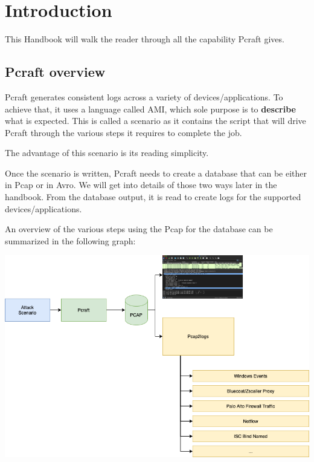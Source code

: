 \documentclass[10pt]{article}
\begin{document}
\newpage

\tableofcontents

\newpage

\section{Introduction}

This Handbook will walk the reader through all the capability Pcraft gives. 

\subsection{Pcraft overview}

Pcraft generates consistent logs across a variety of devices/applications. To achieve that, it uses a language called AMI, which sole purpose
is to \textbf{describe} what is expected. This is called a scenario as it contains the script that will drive Pcraft through the various steps it
requires to complete the job.

The advantage of this scenario is its reading simplicity.

Once the scenario is written, Pcraft needs to create a database that can be either in Pcap or in Avro. We will get into details of those two ways later in the handbook. From the database output, it is read to create logs for the supported devices/applications.

An overview of the various steps using the Pcap for the database can be summarized in the following graph:
\begin{center}
\includegraphics[width=\textwidth]{architecture.png}
\end{center}
\end{document}
